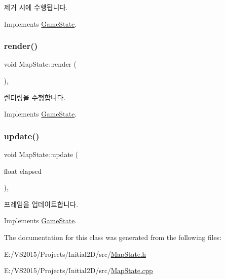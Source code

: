 제거 시에 수행됩니다. 

Implements \mbox{\hyperlink{class_game_state_a17db45d86c52f063cfc854f8ba062178}{Game\+State}}.

\mbox{\label{class_map_state_a6e06116bc2372a7e0939bb129ea66a3e}} 
\subsubsection{\texorpdfstring{render()}{render()}}
{\footnotesize\ttfamily void Map\+State\+::render (\begin{DoxyParamCaption}{ }\end{DoxyParamCaption})\hspace{0.3cm}{\ttfamily [override]}, {\ttfamily [virtual]}}

렌더링을 수행합니다. 

Implements \mbox{\hyperlink{class_game_state_ade2f8ae5aa83f8709863437a8ffba12c}{Game\+State}}.

\mbox{\label{class_map_state_afeafeea186395c2d4c5ce5c4936b9855}} 
\subsubsection{\texorpdfstring{update()}{update()}}
{\footnotesize\ttfamily void Map\+State\+::update (\begin{DoxyParamCaption}\item[{float}]{elapsed }\end{DoxyParamCaption})\hspace{0.3cm}{\ttfamily [override]}, {\ttfamily [virtual]}}

프레임을 업데이트합니다. 

Implements \mbox{\hyperlink{class_game_state_acdace458d1c5a39fdb3bca0d65f88d7d}{Game\+State}}.



The documentation for this class was generated from the following files\+:\begin{DoxyCompactItemize}
\item 
E\+:/\+V\+S2015/\+Projects/\+Initial2\+D/src/\mbox{\hyperlink{_map_state_8h}{Map\+State.\+h}}\item 
E\+:/\+V\+S2015/\+Projects/\+Initial2\+D/src/\mbox{\hyperlink{_map_state_8cpp}{Map\+State.\+cpp}}\end{DoxyCompactItemize}
